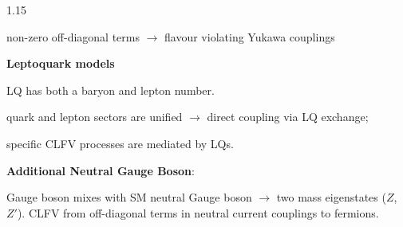 \documentclass{beamer}
\begin{document}
\begin{frame}
\begin{columns}
\begin{column}{1.15\framewidth}
\begin{itemize}
\begin{itemize}
{        \item non-zero off-diagonal terms $\rightarrow$ flavour violating Yukawa couplings}
    \end{itemize}
    {\footnotesize  \item \textbf{Leptoquark models}}
    \begin{itemize}
        {\footnotesize   \item LQ has both a baryon and lepton number. 
        \item quark and lepton sectors are unified $\rightarrow$ direct coupling via LQ exchange;
        \item specific CLFV processes are mediated by LQs.}

    \end{itemize}
    {\footnotesize  \item  \textbf{Additional Neutral Gauge Boson}: }
    \begin{itemize}
        {\footnotesize   \item Gauge boson mixes with SM neutral Gauge boson $\rightarrow$
        two mass eigenstates ($Z$, $Z'$). CLFV from off-diagonal terms in neutral
        current couplings to fermions.}

    \end{itemize}


\end{itemize}
\end{column}
\end{columns}
\end{frame}
\end{document}
